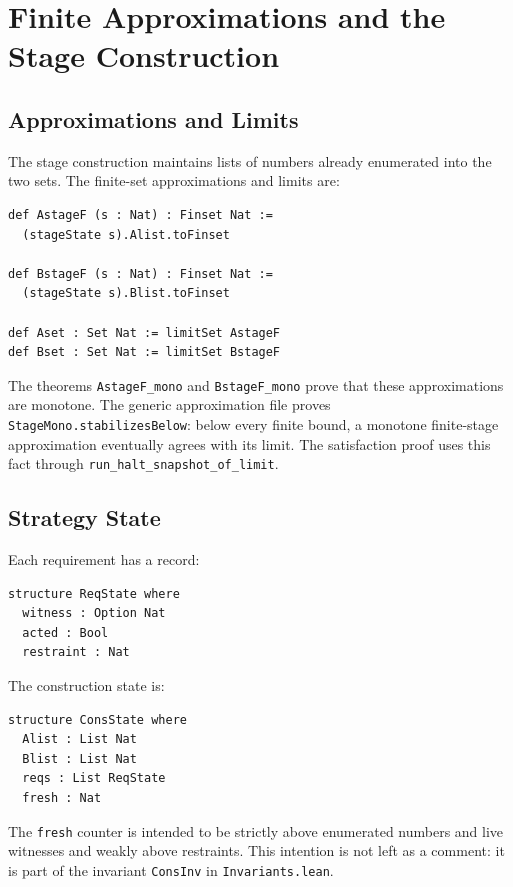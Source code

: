 \section{Finite Approximations and the Stage Construction}

\subsection{Approximations and Limits}

The stage construction maintains lists of numbers already enumerated into
the two sets.  The finite-set approximations and limits are:

\begin{lstlisting}
def AstageF (s : Nat) : Finset Nat :=
  (stageState s).Alist.toFinset

def BstageF (s : Nat) : Finset Nat :=
  (stageState s).Blist.toFinset

def Aset : Set Nat := limitSet AstageF
def Bset : Set Nat := limitSet BstageF
\end{lstlisting}

The theorems \texttt{AstageF_mono} and \texttt{BstageF_mono} prove that
these approximations are monotone.  The generic approximation file proves
\texttt{StageMono.stabilizesBelow}: below every finite bound, a monotone
finite-stage approximation eventually agrees with its limit.  The
satisfaction proof uses this fact through
\texttt{run_halt_snapshot_of_limit}.

\subsection{Strategy State}

Each requirement has a record:

\begin{lstlisting}
structure ReqState where
  witness : Option Nat
  acted : Bool
  restraint : Nat
\end{lstlisting}

The construction state is:

\begin{lstlisting}
structure ConsState where
  Alist : List Nat
  Blist : List Nat
  reqs : List ReqState
  fresh : Nat
\end{lstlisting}

The \texttt{fresh} counter is intended to be strictly above enumerated
numbers and live witnesses and weakly above restraints.  This intention is
not left as a comment: it is part of the invariant \texttt{ConsInv} in
\texttt{Invariants.lean}.


